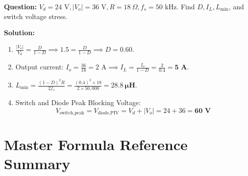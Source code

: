 \documentclass[11pt,a4paper]{article}
\begin{document}
\begin{examplebox}
\textbf{Question:} $V_d = 24\text{ V}, |V_o| = 36\text{ V}, R = 18\ \Omega, f_s = 50\text{ kHz}$. Find $D, I_L, L_{\min}$, and switch voltage stress.

\tcbline
\textbf{Solution:}
\begin{enumerate}[leftmargin=*]
  \item $\frac{|V_o|}{V_d} = \frac{D}{1 - D} \implies 1.5 = \frac{D}{1 - D} \implies D = \mathbf{0.60}$.
  \item Output current: $I_o = \frac{36}{18} = 2\text{ A} \implies I_L = \frac{I_o}{1 - D} = \frac{2}{0.4} = \mathbf{5\text{ A}}$.
  \item $L_{\min} = \frac{(1 - D)^2 R}{2 f_s} = \frac{(0.4)^2 \times 18}{2 \times 50,000} = \mathbf{28.8\ \mu\text{H}}$.
  \item Switch and Diode Peak Blocking Voltage:
  \[
  V_{\text{switch,peak}} = V_{\text{diode,PIV}} = V_d + |V_o| = 24 + 36 = \mathbf{60\text{ V}}
  \]
\end{enumerate}
\end{examplebox}

\newpage
\section{Master Formula Reference Summary}
\end{document}
